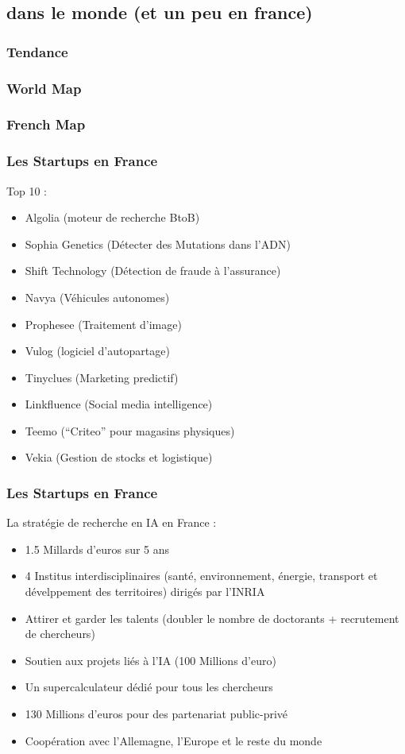 \subsection{dans le monde (et un peu en france)}

\begin{frame}
  \frametitle{Tendance}
\end{frame}

\begin{frame}
  \frametitle{World Map}
\end{frame}

\begin{frame}
  \frametitle{French Map}
\end{frame}

\begin{frame}
  \frametitle{Les Startups en France}
  Top 10 :
  \begin{itemize}
  \item Algolia (moteur de recherche BtoB)
  \item Sophia Genetics (Détecter des Mutations dans l'ADN)
  \item Shift Technology (Détection de fraude à l'assurance)
  \item Navya (Véhicules autonomes)
  \item Prophesee (Traitement d'image)
  \item Vulog (logiciel d'autopartage)
  \item Tinyclues (Marketing predictif)
  \item Linkfluence (Social media intelligence)
  \item Teemo (``Criteo'' pour magasins physiques)
  \item Vekia (Gestion de stocks et logistique)
  \end{itemize}
\end{frame}

\begin{frame}
  \frametitle{Les Startups en France}
  La stratégie de recherche en IA en France :
  \begin{itemize}
  \item 1.5 Millards d'euros sur 5 ans
  \item 4 Institus interdisciplinaires (santé, environnement, énergie, transport et dévelppement des territoires) dirigés par l'INRIA
  \item Attirer et garder les talents (doubler le nombre de doctorants + recrutement de chercheurs)
  \item Soutien aux projets liés à l'IA (100 Millions d'euro)
  \item Un supercalculateur dédié pour tous les chercheurs
  \item 130 Millions d'euros pour des partenariat public-privé
  \item Coopération avec l'Allemagne, l'Europe et le reste du monde
  \end{itemize}
\end{frame}


